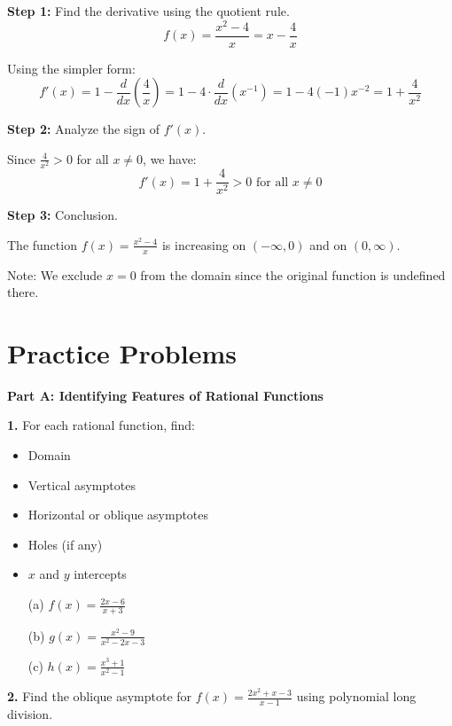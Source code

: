 \documentclass[12pt]{article}
\begin{document}
\textbf{Step 1:} Find the derivative using the quotient rule.
$$f(x) = \frac{x^2 - 4}{x} = x - \frac{4}{x}$$

Using the simpler form:
$$f'(x) = 1 - \frac{d}{dx}\left(\frac{4}{x}\right) = 1 - 4 \cdot \frac{d}{dx}(x^{-1}) = 1 - 4(-1)x^{-2} = 1 + \frac{4}{x^2}$$

\textbf{Step 2:} Analyze the sign of $f'(x)$.

Since $\frac{4}{x^2} > 0$ for all $x \neq 0$, we have:
$$f'(x) = 1 + \frac{4}{x^2} > 0 \text{ for all } x \neq 0$$

\textbf{Step 3:} Conclusion.

The function $f(x) = \frac{x^2 - 4}{x}$ is increasing on $(-\infty, 0)$ and on $(0, \infty)$.

Note: We exclude $x = 0$ from the domain since the original function is undefined there.

\newpage

\section{Practice Problems}

\textbf{Part A: Identifying Features of Rational Functions}

\textbf{1.} For each rational function, find:
\begin{itemize}
\item Domain
\item Vertical asymptotes
\item Horizontal or oblique asymptotes
\item Holes (if any)
\item $x$ and $y$ intercepts
\end{itemize}

\begin{enumerate}
\item[(a)] $f(x) = \frac{2x - 6}{x + 3}$
\vspace{4cm}

\item[(b)] $g(x) = \frac{x^2 - 9}{x^2 - 2x - 3}$
\vspace{4cm}

\item[(c)] $h(x) = \frac{x^3 + 1}{x^2 - 1}$
\vspace{4cm}
\end{enumerate}

\newpage

\textbf{2.} Find the oblique asymptote for $f(x) = \frac{2x^2 + x - 3}{x - 1}$ using polynomial long division.
\vspace{4cm}
\end{document}
